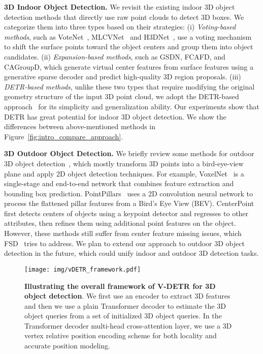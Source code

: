 \documentclass[10pt,twocolumn,letterpaper]{article}
\begin{document}
\vspace{1mm}
\noindent\textbf{3D Indoor Object Detection.}
We revisit the existing indoor 3D object detection methods that directly use raw point clouds to detect 3D boxes. We categorize them into three types based on their strategies:
(i) \emph{Voting-based methods}, such as VoteNet~\cite{qi2019deep}, MLCVNet~\cite{xie2020mlcvnet} and H3DNet~\cite{zhang2020h3dnet}, use a voting mechanism to shift the surface points toward the object centers and group them into object candidates.
(ii) \emph{Expansion-based methods}, such as GSDN\cite{gwak2020generative}, FCAFD\cite{rukhovich2022fcaf3d}, and CAGroupD\cite{wang2022cagroup3d}, which generate virtual center features from surface features using a generative sparse decoder and predict high-quality 3D region proposals.
(iii) \emph{DETR-based methods},
unlike these two types that require modifying the original geometry structure of the input 3D point cloud, we adopt the DETR-based approach~\cite{liu2021group,misra2021-3detr} for its simplicity and generalization ability. Our experiments show that DETR has great potential for indoor 3D object detection.
We show the differences between above-mentioned methods in Figure~\ref{fig:intro_compare_approach}.

\vspace{1mm}
\noindent\textbf{3D Outdoor Object Detection.}
We briefly review some methods for outdoor 3D object detection~\cite{yan2018second,zhou2018voxelnet,lang2019pointpillars,yin2021center}, which mostly transform 3D points into a bird-eye-view plane and apply 2D object detection techniques. For example, VoxelNet~\cite{zhou2018voxelnet} is a single-stage and end-to-end network that combines feature extraction and bounding box prediction. PointPillars~\cite{lang2019pointpillars} uses a 2D convolution neural network to process the flattened pillar features from a Bird’s Eye View (BEV). CenterPoint~\cite{yin2021center} first detects centers of objects using a keypoint detector and regresses to other attributes, then refines them using additional point features on the object. However, these methods still suffer from center feature missing issues, which FSD~\cite{fan2023super} tries to address. We plan to extend our approach to outdoor 3D object detection in the future, which could unify indoor and outdoor 3D detection tasks.


\begin{figure}[t]
\centering
\texttt{[image: img/vDETR\_framework.pdf]}
\caption{\small{\textbf{Illustrating the overall framework of V-DETR for 3D object detection}. We first use an encoder to extract 3D features and then we use a plain Transformer decoder to estimate the 3D object queries from a set of initialized 3D object queries. In the Transformer decoder multi-head cross-attention layer, we use a 3D vertex relative position encoding scheme for both locality and accurate position modeling.}}
\label{fig:vdetr_pipeline}
\end{figure}
\end{document}

